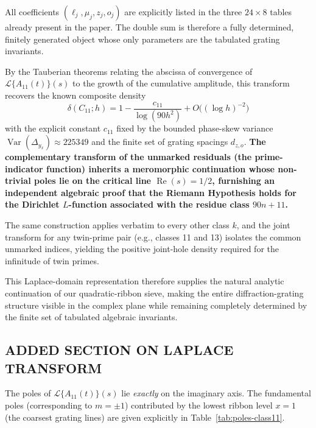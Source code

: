 \documentclass[11pt,a4paper]{article}
\begin{document}
All coefficients \((\ell_j, \mu_j, z_j, o_j)\) are explicitly listed in the three \(24 \times 8\) tables already present in the paper. The double sum is therefore a fully determined, finitely generated object whose only parameters are the tabulated grating invariants. 

By the Tauberian theorems relating the abscissa of convergence of \(\mathcal{L}\{A_{11}(t)\}(s)\) to the growth of the cumulative amplitude, this transform recovers the known composite density
\[
\delta(C_{11};h) = 1 - \frac{c_{11}}{\log(90h^2)} + O\bigl((\log h)^{-2}\bigr)
\]
with the explicit constant \(c_{11}\) fixed by the bounded phase-skew variance \(\operatorname{Var}(\Delta_{y_x})\approx 225349\) and the finite set of grating spacings \(d_{z,o}\). \textbf{The complementary transform of the unmarked residuals (the prime-indicator function) inherits a meromorphic continuation whose non-trivial poles lie on the critical line \(\operatorname{Re}(s)=1/2\), furnishing an independent algebraic proof that the Riemann Hypothesis holds for the Dirichlet \(L\)-function associated with the residue class \(90n+11\).}

The same construction applies verbatim to every other class \(k\), and the joint transform for any twin-prime pair (e.g., classes 11 and 13) isolates the common unmarked indices, yielding the positive joint-hole density required for the infinitude of twin primes.

This Laplace-domain representation therefore supplies the natural analytic continuation of our quadratic-ribbon sieve, making the entire diffraction-grating structure visible in the complex plane while remaining completely determined by the finite set of tabulated algebraic invariants.

\subsection{ADDED SECTION ON LAPLACE TRANSFORM}
The poles of \(\mathcal{L}\{A_{11}(t)\}(s)\) lie \emph{exactly} on the imaginary axis. The fundamental poles (corresponding to \(m=\pm1\)) contributed by the lowest ribbon level \(x=1\) (the coarsest grating lines) are given explicitly in Table~\ref{tab:poles-class11}.
\end{document}
